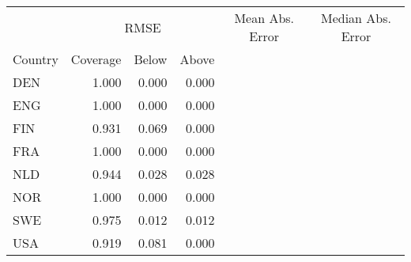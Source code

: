 \begin{table}[!h]
\centering
\begin{tabular}{l|r|r|r}
\hline
\multicolumn{1}{c|}{ } & \multicolumn{3}{c|}{RMSE} & \multicolumn{3}{c|}{Mean Abs. Error} & \multicolumn{3}{c}{Median Abs. Error} \\
\cline{2-4} \cline{5-7} \cline{8-10}
Country & Coverage & Below & Above\\
\hline
DEN & 1.000 & 0.000 & 0.000\\
ENG & 1.000 & 0.000 & 0.000\\
FIN & 0.931 & 0.069 & 0.000\\
FRA & 1.000 & 0.000 & 0.000\\
NLD & 0.944 & 0.028 & 0.028\\
NOR & 1.000 & 0.000 & 0.000\\
SWE & 0.975 & 0.012 & 0.012\\
USA & 0.919 & 0.081 & 0.000\\
\hline
\end{tabular}
\end{table}
